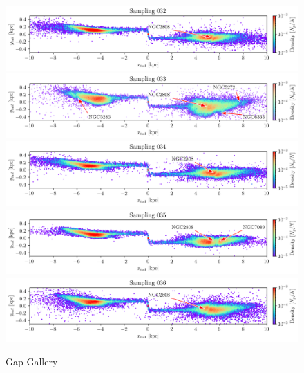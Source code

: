 \documentclass[draft]{aa}
\begin{document}
\begin{appendix}
    \begin{figure}
      \centering
      \includegraphics[width=\linewidth]{gallery_of_gaps_monte-carlo-032.png}
      \includegraphics[width=\linewidth]{gallery_of_gaps_monte-carlo-033.png}
      \includegraphics[width=\linewidth]{gallery_of_gaps_monte-carlo-034.png}      
      \includegraphics[width=\linewidth]{gallery_of_gaps_monte-carlo-035.png}
      \includegraphics[width=\linewidth]{gallery_of_gaps_monte-carlo-036.png}      
      \caption{Gap Gallery}
      \label{fig:gallery8}
      \end{figure}    




\end{appendix}
\end{document}
